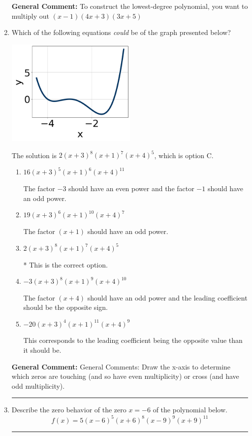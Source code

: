 \documentclass{extbook}[14pt]
\newcommand{\litem}[1]{\item #1

\rule{\textwidth}{0.4pt}}
\begin{document}
\begin{enumerate}
{\textbf{General Comment:} To construct the lowest-degree polynomial, you want to multiply out $(x -1)(4x + 3)(3x + 5)$
}
\litem{
Which of the following equations \textit{could} be of the graph presented below?

\begin{center}
    \includegraphics[width=0.5\textwidth]{../Figures/polyGraphToFunctionB.png}
\end{center}




The solution is \( 2(x + 3)^{8} (x + 1)^{7} (x + 4)^{5} \), which is option C.\begin{enumerate}[label=\Alph*.]
\item \( 16(x + 3)^{5} (x + 1)^{6} (x + 4)^{11} \)

The factor $-3$ should have an even power and the factor $-1$ should have an odd power.
\item \( 19(x + 3)^{6} (x + 1)^{10} (x + 4)^{7} \)

The factor $(x + 1)$ should have an odd power.
\item \( 2(x + 3)^{8} (x + 1)^{7} (x + 4)^{5} \)

* This is the correct option.
\item \( -3(x + 3)^{8} (x + 1)^{9} (x + 4)^{10} \)

The factor $(x + 4)$ should have an odd power and the leading coefficient should be the opposite sign.
\item \( -20(x + 3)^{4} (x + 1)^{11} (x + 4)^{9} \)

This corresponds to the leading coefficient being the opposite value than it should be.
\end{enumerate}

\textbf{General Comment:} General Comments: Draw the x-axis to determine which zeros are touching (and so have even multiplicity) or cross (and have odd multiplicity).
}
\litem{
Describe the zero behavior of the zero $x = -6$ of the polynomial below.
\[ f(x) = 5(x - 6)^{5}(x + 6)^{8}(x - 9)^{9}(x + 9)^{11} \]

}
\end{enumerate}
\end{document}

